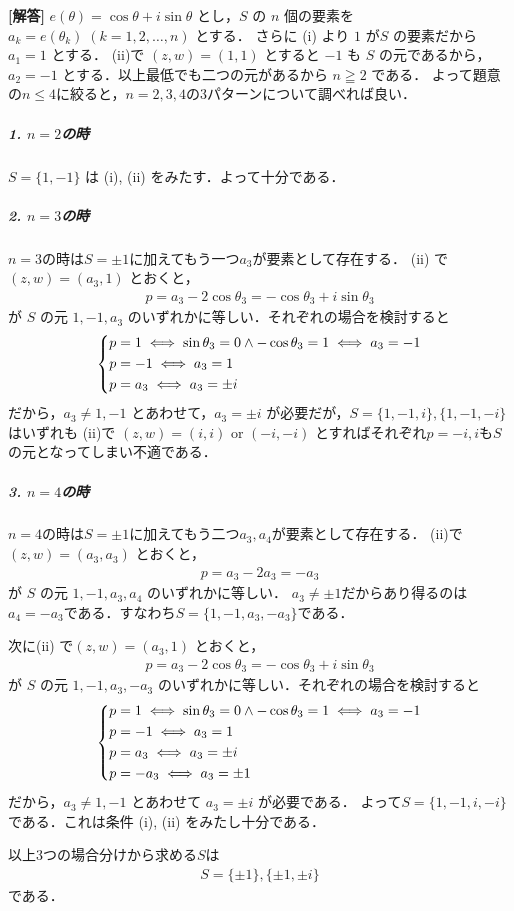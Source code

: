 \documentclass[../../main.tex]{subfiles}
\begin{document}
\begin{oframed}
  
\end{oframed}

{\bf [解答]}
$e(\theta) = \cos\theta + i \sin\theta$ とし，$S$ の $n$ 個の要素を $a_k = e(\theta_k) \; (k=1, 2, \dots, n)$ とする．
さらに (i) より $1$ が$S$ の要素だから $a_1 = 1$ とする．
(ii)で $(z, w) = (1, 1)$ とすると $-1$ も $S$ の元であるから， $a_2 = -1$ とする．以上最低でも二つの元があるから $n \geqq 2$ である．
よって題意の$n\le 4$に絞ると，$n=2, 3, 4$の3パターンについて調べれば良い．

\subparagraph{1. $n=2$の時}
$S = \{1, -1\}$ は (i), (ii) をみたす．よって十分である．

\subparagraph{2. $n=3$の時}
$n=3$の時は$S=\pm 1$に加えてもう一つ$a_3$が要素として存在する．
(ii) で$(z, w) = (a_3, 1)$ とおくと，
\begin{align}
  p = a_3 - 2 \cos\theta_3 = -\cos\theta_3 + i \sin\theta_3
\end{align}
が $S$ の元 $1, -1, a_3$ のいずれかに等しい．それぞれの場合を検討すると
\begin{align}
  \begin{dcases}
    p = 1 \iff \sin\theta_3 = 0 \land -\cos\theta_3 = 1 \iff a_3 = -1 \\
    p = -1 \iff a_3 = 1 \\
    p = a_3 \iff a_3 = \pm i
  \end{dcases}
\end{align}
だから，$a_3 \neq 1, -1$ とあわせて，$a_3 = \pm i$ が必要だが，$S = \{1, -1, i\}, \{1, -1, -i\}$ はいずれも (ii)で $(z, w) = (i, i)$ or $(-i, -i)$ とすればそれぞれ$p=-i, i$も$S$の元となってしまい不適である．

\subparagraph{3. $n=4$の時}

$n=4$の時は$S=\pm 1$に加えてもう二つ$a_3,a_4$が要素として存在する．
(ii)で$(z, w) = (a_3, a_3)$ とおくと，
\begin{align}
  p = a_3 - 2 a_3 = - a_3
\end{align}
が $S$ の元 $1, -1, a_3, a_4$ のいずれかに等しい．
$a_3 \neq \pm 1$だからあり得るのは$a_4 = -a_3$である．すなわち$S = \{1,-1,a_3,-a_3\}$である．

次に(ii) で$(z, w) = (a_3, 1)$ とおくと，
\begin{align}
  p = a_3 - 2 \cos\theta_3 = -\cos\theta_3 + i \sin\theta_3
\end{align}
が $S$ の元 $1, -1, a_3, -a_3$ のいずれかに等しい．それぞれの場合を検討すると
\begin{align}
  \begin{dcases}
    p = 1 \iff \sin\theta_3 = 0 \land -\cos\theta_3 = 1 \iff a_3 = -1 \\
    p = -1 \iff a_3 = 1 \\
    p = a_3 \iff a_3 = \pm i \\
    p = -a_3 \iff a_3 = \pm 1
  \end{dcases}
\end{align}
だから，$a_3 \neq 1, -1$ とあわせて $a_3 = \pm i$ が必要である．
よって$S = \{1, -1, i, -i\}$である．これは条件 (i), (ii) をみたし十分である．
\casesend

以上3つの場合分けから求める$S$は
\begin{align}
  S = \{\pm 1\}, \{\pm 1, \pm i\}
\end{align}
である．
\end{document}

